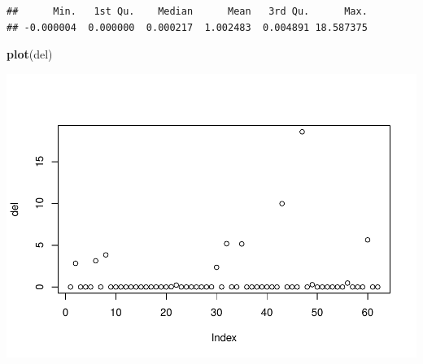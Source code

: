 \documentclass[]{article}
\newenvironment{Shaded}{\begin{snugshade}}{\end{snugshade}}
\newcommand{\KeywordTok}[1]{\textcolor[rgb]{0.13,0.29,0.53}{\textbf{#1}}}
\newcommand{\NormalTok}[1]{#1}
\begin{document}
\begin{verbatim}
##      Min.   1st Qu.    Median      Mean   3rd Qu.      Max. 
## -0.000004  0.000000  0.000217  1.002483  0.004891 18.587375
\end{verbatim}

\begin{Shaded}
\begin{Highlighting}[]
\KeywordTok{plot}\NormalTok{(del)}
\end{Highlighting}
\end{Shaded}

\includegraphics{simulation_test_files/figure-latex/unnamed-chunk-1-1.pdf}
\end{document}
